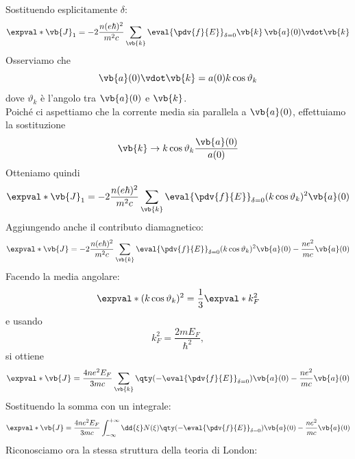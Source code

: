 Sostituendo esplicitamente $\delta$:
\begin{equation*}
   \expval*{\vb{J}_1}
   =
   -2
   \frac{n(e\hbar)^2}{m^2c}
   \sum_{\vb{k}}
   \eval{\pdv{f}{E}}_{\delta=0}
   \vb{k}
   \,
   \vb{a}(0)\vdot\vb{k}
\end{equation*}
Osserviamo che
\begin{equation*}
   \vb{a}(0)\vdot\vb{k}
   =
   a(0)k\cos\vartheta_k
\end{equation*}
dove $\vartheta_k$ è l'angolo tra $\vb{a}(0)$ e $\vb{k}$.\\
Poiché ci aspettiamo che la corrente media sia parallela a $\vb{a}(0)$, effettuiamo la sostituzione
\begin{equation*}
   \vb{k}
   \to
   k\cos\vartheta_k
   \frac{\vb{a}(0)}{a(0)}
\end{equation*}
Otteniamo quindi
\begin{equation*}
   \expval*{\vb{J}_1}
   =
   -2
   \frac{n(e\hbar)^2}{m^2c}
   \sum_{\vb{k}}
   \eval{\pdv{f}{E}}_{\delta=0}
   (k\cos\vartheta_k)^2
   \vb{a}(0)
\end{equation*}
Aggiungendo anche il contributo diamagnetico:
\begin{equation*}
   \expval*{\vb{J}}
   =
   -2
   \frac{n(e\hbar)^2}{m^2c}
   \sum_{\vb{k}}
   \eval{\pdv{f}{E}}_{\delta=0}
   (k\cos\vartheta_k)^2
   \vb{a}(0)
   -
   \frac{ne^2}{mc}
   \vb{a}(0)
\end{equation*}
Facendo la media angolare:
\begin{equation*}
   \expval*{
      (k\cos\vartheta_k)^2
   }
   =
   \frac13
   \expval*{k_F^2}
\end{equation*}
e usando
\begin{equation*}
   k_F^2
   =
   \frac{2mE_F}{\hbar^2},
\end{equation*}
si ottiene
\begin{equation*}
   \expval*{\vb{J}}
   =
   \frac{
      4ne^2E_F
   }{
      3mc
   }
   \sum_{\vb{k}}
   \qty(
      -
      \eval{\pdv{f}{E}}_{\delta=0}
   )
   \vb{a}(0)
   -
   \frac{ne^2}{mc}
   \vb{a}(0)
\end{equation*}
Sostituendo la somma con un integrale:
\begin{equation*}
   \expval*{\vb{J}}
   =
   \frac{
      4ne^2E_F
   }{
      3mc
   }
   \int_{-\infty}^{+\infty}
   \dd{\xi}
   N(\xi)
   \qty(
      -
      \eval{\pdv{f}{E}}_{\delta=0}
   )
   \vb{a}(0)
   -
   \frac{ne^2}{mc}
   \vb{a}(0)
\end{equation*}
Riconosciamo ora la stessa struttura della teoria di London:
